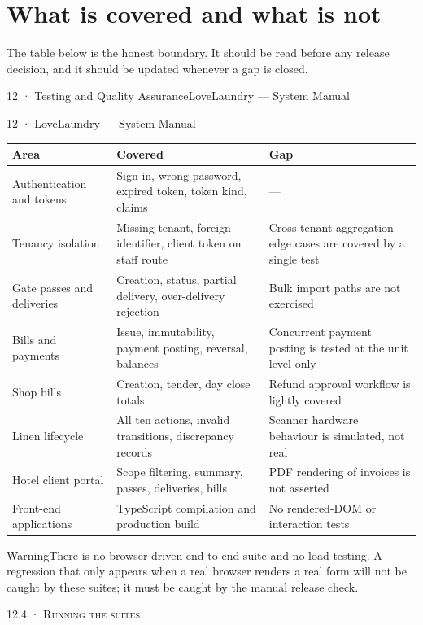 \documentclass[11pt,a4paper,oneside]{book}
\begin{document}
\section*{What is covered and what is not}
The table below is the honest boundary. It should be read before any release decision, and it should be updated whenever a gap is closed.

12 · Testing and Quality AssuranceLoveLaundry — System Manual

12 · LoveLaundry — System Manual

\begin{center}\small
\begin{tabularx}{\linewidth}{|X|X|X|}
\hline
\rowcolor{lightgrey}
\textbf{Area} & \textbf{Covered} & \textbf{Gap} \\ \hline
Authentication and tokens & Sign-in, wrong password, expired token, token kind, claims & — \\ \hline
Tenancy isolation & Missing tenant, foreign identifier, client token on staff route & Cross-tenant aggregation edge cases are covered by a single test \\ \hline
Gate passes and deliveries & Creation, status, partial delivery, over-delivery rejection & Bulk import paths are not exercised \\ \hline
Bills and payments & Issue, immutability, payment posting, reversal, balances & Concurrent payment posting is tested at the unit level only \\ \hline
Shop bills & Creation, tender, day close totals & Refund approval workflow is lightly covered \\ \hline
Linen lifecycle & All ten actions, invalid transitions, discrepancy records & Scanner hardware behaviour is simulated, not real \\ \hline
Hotel client portal & Scope filtering, summary, passes, deliveries, bills & PDF rendering of invoices is not asserted \\ \hline
Front-end applications & TypeScript compilation and production build & No rendered-DOM or interaction tests \\ \hline
\end{tabularx}
\end{center}
\begin{notebox}WarningThere is no browser-driven end-to-end suite and no load testing. A regression that only appears when a real browser renders a real form will not be caught by these suites; it must be caught by the manual release check.\end{notebox}
\textsc{\small\color{crimson}12.4 · Running the suites}\par\medskip
\end{document}
